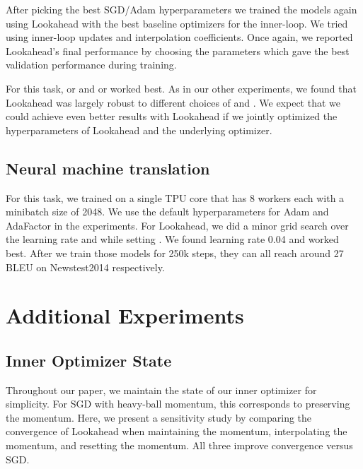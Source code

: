 \documentclass{article}
\begin{document}
After picking the best SGD/Adam hyperparameters we trained the models again using Lookahead with the best baseline optimizers for the inner-loop. We tried using  inner-loop updates and  interpolation coefficients. Once again, we reported Lookahead's final performance by choosing the parameters which gave the best validation performance during training.

For this task,  or  and  or  worked best. As in our other experiments, we found that Lookahead was largely robust to different choices of  and . We expect that we could achieve even better results with Lookahead if we jointly optimized the hyperparameters of Lookahead and the underlying optimizer.

\subsection{Neural machine translation}
\label{app:nmt}

For this task, we trained on a single TPU core that has 8 workers each with a minibatch size of 2048. We use the default hyperparameters for Adam \citep{vaswani2017attention} and AdaFactor \citep{adafactor} in the experiments. For Lookahead, we did a minor grid search over the learning rate  and  while setting . We found learning rate 0.04 and  worked best. After we train those models for 250k steps, they can all reach around 27 BLEU on Newstest2014 respectively.







\section{Additional Experiments}

\subsection{Inner Optimizer State}
\label{app:interpolation}

Throughout our paper, we maintain the state of our inner optimizer for simplicity. For SGD with heavy-ball momentum, this corresponds to preserving the momentum. Here, we present a sensitivity study by comparing the convergence of Lookahead when maintaining the momentum, interpolating the momentum, and resetting the momentum. All three improve convergence versus SGD.
\end{document}
